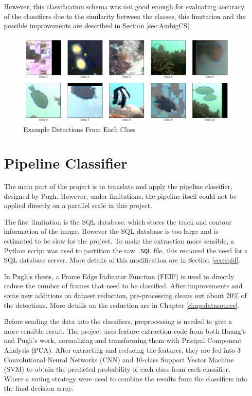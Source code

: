 \documentclass[bsc,logo,twoside,fullspacing,parskip]{infthesis}
\begin{document}
However, this classification schema was not good enough for evaluating accuracy of the classifiers due to the similarity between the classes, this limitation and the possible improvements are described in Section \ref{sec:AmbigCS}.

\begin{figure}
    \centering
    \includegraphics[scale=0.4]{graph/class_sample.png}
    \caption{Example Detections From Each Class}
    \label{fig:classes}
\end{figure}

\section{Pipeline Classifier}

The main part of the project is to translate and apply the pipeline classifier, designed by Pugh\cite{Pugh}. 
However, under limitations, the pipeline itself could not be applied directly on a parallel scale in this project.

The first limitation is the SQL database, which stores the track and contour information of the image. 
However the SQL database is too large and is estimated to be slow for the project.
To make the extraction more sensible, a Python script was used to partition the raw {\tt .SQL} file, this removed the need for a SQL database server. 
More details of this modification are in Section \ref{sec:sqld}.

In Pugh's thesis\cite{Pugh}, a Frame Edge Indicator Function (FEIF) is used to directly reduce the number of frames that need to be classified. 
After improvements and some new additions on dataset reduction, pre-processing cleans out about 20\% of the detections. More details on the reduction are in Chapter \ref{chap:datasource}.

Before sending the data into the classifiers, preprocessing is needed to give a more sensible result.
The project uses feature extraction code from both Huang's\cite{Huang} and Pugh's\cite{Pugh} work, normalizing and transforming them with Pricipal Component Analysis (PCA).
After extracting and reducing the features, they are fed into 3 Convolutional Neural Networks (CNN) and 10-class Support Vector Machine (SVM) to obtain the predicted probability of each class from each classifier.
Where a voting strategy were used to combine the results from the classifiers into the final decision array.
\end{document}
